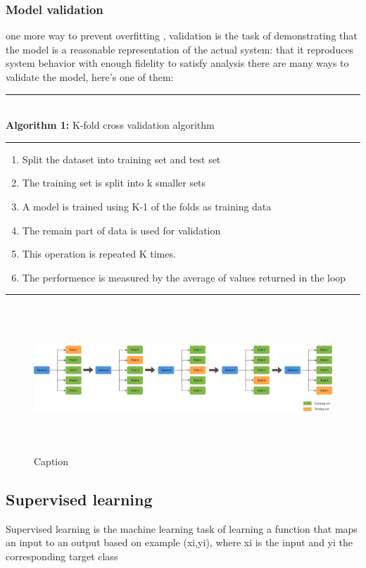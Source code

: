 \subsubsection{Model validation}
one more way to prevent overfitting , validation is the task of demonstrating that the model is a reasonable representation of the actual system: that it reproduces system behavior with enough fidelity to satisfy analysis  \cite{art5}
there are many ways to validate the model, here’s one of them:
\rule[0.5ex]{\linewidth}{1pt}\\
\textbf{Algorithm 1: }K-fold cross validation algorithm \\
\rule[0.5ex]{\linewidth}{1pt}
\begin{enumerate}
    \item Split the dataset into training set and test set
    \item The training set is split into k smaller sets
    \item A model is trained using K-1 of the folds as training data
    \item The remain part of data is used for validation
    \item This operation is repeated K times.
    \item The performence is measured by the average of values returned in the loop
\end{enumerate}
\rule[0.5ex]{\linewidth}{1pt}
\begin{figure}[!h]
    \centering
    \includegraphics[width=17cm,height=5.5cm]{chapters/chapter02/fig02/kfold.png}
    \caption{Caption}
    \label{fig:my_label}
\end{figure}
\subsection{Supervised learning}
Supervised learning is the machine learning task of learning a function that maps an input to
an output based on example (xi,yi), where xi is the input and yi the corresponding target class \cite{art5}
